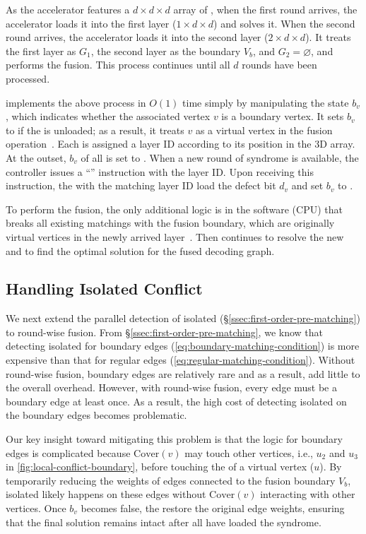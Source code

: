 As the accelerator features a $d\times d\times d$ array of \puvs, when the first round arrives, the accelerator loads it into the first layer ($1\times d\times d$) and solves it. When the second round arrives, the accelerator loads it into the second layer ($2\times d\times d$). It treats the first layer as $G_1$, the second layer as the boundary $V_b$, and $G_2=\varnothing$, and performs the fusion. This process continues until all $d$ rounds have been processed.

\arch implements the above process in $O(1)$ time simply by manipulating the \puv state $b_v$, which indicates whether the associated vertex $v$ is a boundary vertex.
It sets $b_v$ to  if the \puv is unloaded; as a result, it treats $v$ as a virtual vertex in the fusion operation~\cite{wu2023qce}.
Each \puv is assigned a layer ID according to its position in the 3D array.
At the outset, $b_v$ of all \puvs is set to .
When a new round of syndrome is available, the controller issues a ``'' instruction with the layer ID.
Upon receiving this instruction, the \puvs with the matching layer ID load the defect bit $d_v$ and set $b_v$ to .

To perform the fusion, the only additional logic is in the software (CPU) that breaks all existing matchings with the fusion boundary, which are originally virtual vertices in the newly arrived layer~\cite{wu2023qce}. Then \arch continues to resolve the new \confs and to find the optimal solution for the fused decoding graph.

\subsection{Handling Isolated Conflict}\label{ssec:micro-fusion-extension}

We next extend the parallel detection of isolated \confs (\S\ref{ssec:first-order-pre-matching}) to round-wise fusion.
From \S\ref{ssec:first-order-pre-matching}, we know that detecting isolated \confs for boundary edges (\autoref{eq:boundary-matching-condition}) is more expensive than that for regular edges (\autoref{eq:regular-matching-condition}).
Without round-wise fusion, boundary edges are relatively rare and as a result, add little to the overall overhead.
However, with round-wise fusion, every edge must be a boundary edge at least once. As a result, the high cost of detecting isolated \confs on the boundary edges becomes problematic.

Our key insight toward mitigating this problem is that the logic for boundary edges is complicated because $\text{Cover}(v)$ may touch other vertices, i.e., $u_2$ and $u_3$ in \autoref{fig:local-conflict-boundary}, before touching the \cov of a virtual vertex ($u$). 
By temporarily reducing the weights of edges connected to the fusion boundary $V_b$, isolated \conf likely happens on these edges without $\text{Cover}(v)$ interacting with other vertices.
Once $b_v$ becomes false, the \pues restore the original edge weights, ensuring that the final solution remains intact after all \puvs have loaded the syndrome.

